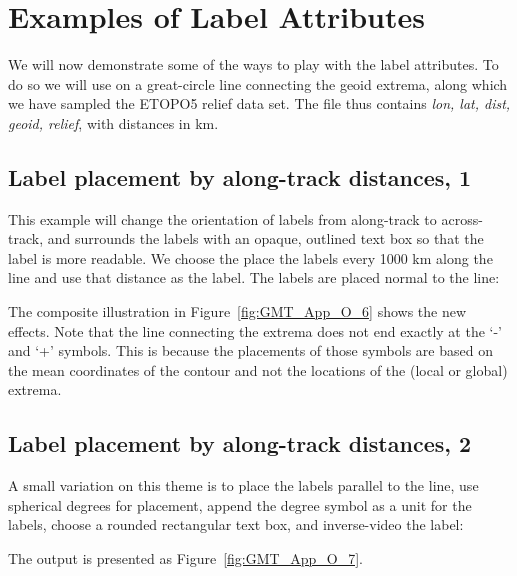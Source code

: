 \section{Examples of Label Attributes}

We will now demonstrate some of the ways to play with the label attributes.  To do so we
will use  on a great-circle line connecting the geoid extrema, along which
we have sampled the ETOPO5 relief data set.  The file  thus contains
{\it lon, lat, dist, geoid, relief}, with distances in km.

\subsection{Label placement by along-track distances, 1}

This example will change the orientation of labels from along-track to across-track, and
surrounds the labels with an opaque, outlined text box so that the label is more readable.  We choose
the place the labels every 1000 km along the line and use that distance as the label.  The
labels are placed normal to the line:



\noindent
The composite illustration in Figure~\ref{fig:GMT_App_O_6} shows the new effects.  Note that
the line connecting the extrema does not end exactly at the `-' and `+' symbols.  This is
because the placements of those symbols are based on the mean coordinates of the contour and
not the locations of the (local or global) extrema.

\subsection{Label placement by along-track distances, 2}

A small variation on this theme is to place the labels parallel to the line, use
spherical degrees for placement, append the degree symbol as a unit for the
labels, choose a rounded rectangular text box, and inverse-video the label:


\noindent
The output is presented as Figure~\ref{fig:GMT_App_O_7}.


